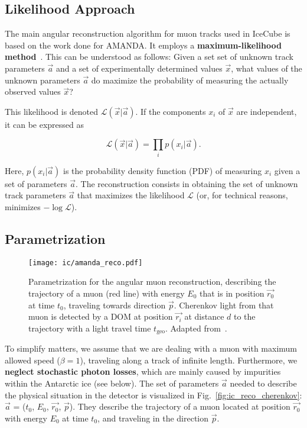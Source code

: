 \subsection{Likelihood Approach}
The main angular reconstruction algorithm for muon tracks used in IceCube is based on the work done for AMANDA. It employs a \textbf{maximum-likelihood method}~. This can be understood as follows: Given a set set of unknown track parameters $\vec{a}$ and a set of experimentally determined values $\vec{x}$, what values of the unknown parameters $\vec{a}$ do maximize the probability of measuring the actually observed values $\vec{x}$?

This likelihood is denoted $\mathcal{L}(\vec{x}|\vec{a})$. If the components $x_i$ of $\vec{x}$ are independent, it can be expressed as

\begin{equation}
    \mathcal{L}(\vec{x}|\vec{a}) = \prod_i p(x_i|\vec{a}).
\end{equation}

Here, $p(x_i|\vec{a})$ is the probability density function (PDF) of measuring $x_i$ given a set of parameters $\vec{a}$. The reconstruction consists in obtaining the set of unknown track parameters $\vec{a}$ that maximizes the likelihood $\mathcal{L}$ (or, for technical reasons, minimizes $-\log{\mathcal{L}}$).

\subsection{Parametrization}
\begin{figure}[htb]
    \texttt{[image: ic/amanda\_reco.pdf]}
    \caption[Angular reconstruction in IceCube]{Parametrization for the angular muon reconstruction, describing the trajectory of a muon (red line) with energy $E_0$ that is in position $\vec{r_0}$ at time $t_0$, traveling towards direction $\vec{p}$. Cherenkov light from that muon is detected by a DOM at position $\vec{r_i}$ at distance $d$ to the trajectory with a light travel time $t_\text{geo}$. Adapted from~\cite{Ahrens2004}.}
\end{figure}

To simplify matters, we assume that we are dealing with a muon with maximum allowed speed ($\beta=1$), traveling along a track of infinite length. Furthermore, we \textbf{neglect stochastic photon losses}, which are mainly caused by impurities within the Antarctic ice (see below). The set of parameters $\vec{a}$ needed to describe the physical situation in the detector is visualized in Fig.~\ref{fig:ic_reco_cherenkov}: $\vec{a}$ = ($t_0$, $E_0$, $\vec{r_0}$, $\vec{p}$). They describe the trajectory of a muon located at position $\vec{r_0}$ with energy $E_0$ at time $t_0$, and traveling in the direction $\vec{p}$.

